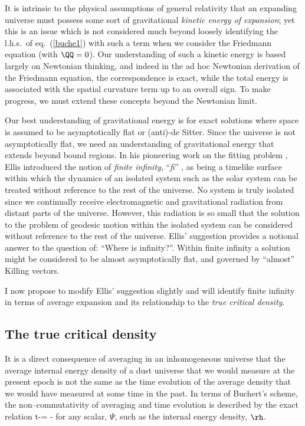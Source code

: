 \documentclass[12pt]{iopart}
\begin{document}
It is intrinsic to the physical assumptions of general relativity that an
expanding universe must possess some sort of gravitational {\em kinetic
energy of expansion}; yet this is an issue which is not considered much beyond
loosely identifying the l.h.s.\ of eq.~(\ref{buche1}) with such a term when
we consider the Friedmann equation (with $\QQ=0$). Our understanding of such
a kinetic energy is based largely on Newtonian thinking, and indeed in the
ad hoc Newtonian derivation of the Friedmann equation, the correspondence
is exact, while the total energy is associated with the spatial curvature
term up to an overall sign. To make progress, we must extend these concepts
beyond the Newtonian limit.

Our best understanding of gravitational energy is for exact solutions where
space is assumed to be asymptotically flat or (anti)-de Sitter. Since the
universe is not asymptotically flat, we need an understanding of
gravitational energy that extends beyond bound regions. In his pioneering work
on the fitting problem \cite{fit1}, Ellis introduced the notion of
{\em finite infinity}, ``{\em fi}'' ,
as being a timelike surface within which the dynamics of an isolated
system such as the solar system can be treated without reference to the
rest of the universe. No system is truly isolated since we continually
receive electromagnetic and gravitational radiation from distant parts
of the universe. However, this radiation is so small that the solution
to the problem of geodesic motion within the isolated system can be
considered without reference to the rest of the universe. Ellis' suggestion
provides a notional answer to the question of: ``Where is infinity?''.
Within finite infinity a solution might be considered to be almost
asymptotically flat, and governed by ``almost'' Killing vectors.

I now propose to modify Ellis' suggestion slightly and will identify finite
infinity in terms of average expansion and its relationship to the
{\em true critical density}.

\subsection{The true critical density}

It is a direct consequence of averaging in an inhomogeneous universe
that the average internal energy density of a dust universe that we would
measure at the present epoch
is not the same as the time evolution of the average density that we would
have measured at some time in the past. In terms of Buchert's scheme,
the non--commutativity of averaging and time evolution is described by
the exact relation \cite{buch1}
\beq\Deriv{\dd}t{}\ave\Psi-=\ave{\Psi\th}
-\ave\th\ave\Psi\label{comm}\eeq
for any scalar, $\Psi$, such as the internal energy density, $\rh$.
\end{document}
